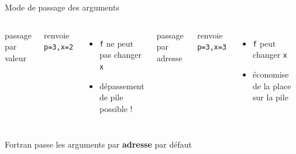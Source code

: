 \documentclass[11pt,mathserif]{beamer}
\newcommand{\scout}{\faAngellist}
\newcommand{\argi}{\faLightbulbO}
\newcommand{\kontuz}{\faExclamationTriangle}
\newcommand{\triste}{\faFrownO}
\newcommand{\petiteFont}{\relsize{-5}\ttfamily}
\newif\ifC
\newcommand{\mylang}{c}
\newcommand{\extlang}{c}
\newcommand{\mylang}{fortran}
\newcommand{\extlang}{f90}
\newcommand{\includeSrc}[1]{}
\begin{document}
\ifC
\begin{frame}{Interlude sur les Pointeurs}
  \lstset{basicstyle=\relsize{-1}\ttfamily}
\begin{itemize}[<+->]
  \item Un pointeur est une variable contenant l'adresse d'une autre
  \item déclaration : \lstinline! int * p; // p est pointeur sur des ints !
  \item allocation  : \lstinline! p = (int *) malloc(4*sizeof(int)); // alloue 4 entiers !
  \item désallocation : \lstinline! free(p); // libere la memoire !
  \item déréfencement : \lstinline! *p = 2 ;! ou \lstinline !p[0] = 2;!
  \item «adresse de» : \lstinline! int t[] = \{1,2,3\} ; p=\&t[0] ; (*p)++;!
  \item[\argi] \lstinline!*! $\circ$ \lstinline!\&! = $I_{valeurs}$ et \lstinline!\&! $\circ$ \lstinline!*! = $I_{adresses}$
  \item arithmétique : \lstinline! for(p=\&t[0]; p\!=\&t[0]+3;) (*(p++))++; !
  \item[\scout] notation : \lstinline! p[i] ! $\equiv$ \lstinline! *(i+p)! $\equiv$ \lstinline! i[p]!
  \item utilisation 
    \begin{itemize}
      \item passage par adresse des arguments de fonction
      \item gestion de mémoire
    \end{itemize}
\end{itemize}
  \lstset{basicstyle=\petiteFont}
\end{frame}
\fi
\begin{frame}{Mode de passage des arguments}
\begin{columns}[t]
\pause
\column{5cm}
 passage par valeur
  \includeSrc{code/valeur}
  renvoie \lstinline! p=3,x=2!
  \begin{itemize}
    \item[\triste] {\tt f} ne peut pas changer {\tt x}
    \item[\kontuz] dépassement de pile possible !
   \end{itemize} 
\pause
\column{5cm}
 passage par adresse
  \includeSrc{code/adresse}
  renvoie \lstinline! p=3,x=3!
  \begin{itemize}
    \item[\scout] {\tt f} peut changer {\tt x}
    \item[\argi] économise de la place sur la pile
   \end{itemize} 
\end{columns}
  \begin{center}
    \ifC le C passe les arguments par {\bf valeur } \else Fortran passe les arguments par {\bf adresse } \fi par défaut
  \end{center} 
\end{frame}
\end{document}
